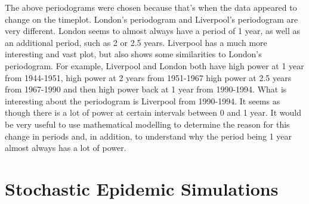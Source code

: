 \documentclass[12pt]{article}\usepackage[]{graphicx}\usepackage[]{color}
\newenvironment{knitrout}{}{} %
\begin{document}
\begin{enumerate}[(a)]
\begin{knitrout}
\end{knitrout}

The above periodograms were chosen because that's when the data appeared to change on the timeplot. London's periodogram and Liverpool's periodogram are very different. London seems to almost always have a period of 1 year, as well as an additional period, such as 2 or 2.5 years. Liverpool has a much more interesting and vast plot, but also shows some similarities to London's periodogram. For example, Liverpool and London both have high power at 1 year from 1944-1951, high power at 2 years from 1951-1967 high power at 2.5 years from 1967-1990 and then high power back at 1 year from 1990-1994. What is interesting about the periodogram is Liverpool from 1990-1994. It seems as though there is a lot of power at certain intervals between 0 and 1 year. It would be very useful to use mathematical modelling to determine the reason for this change in periods and, in addition, to understand why the period being 1 year almost always has a lot of power.

\end{enumerate}

\section{Stochastic Epidemic Simulations}
\end{document}
